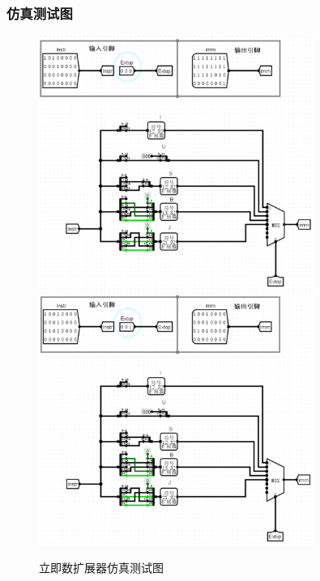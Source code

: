 \documentclass{article}
\begin{document}
    \subsubsection{仿真测试图}
    \begin{figure}[H]
    \centering
    \includegraphics[width=0.8\textwidth]{4.5.1.png}
    \includegraphics[width=0.8\textwidth]{4.5.2.png}
    \caption{立即数扩展器仿真测试图}
    \end{figure}
\end{document}
